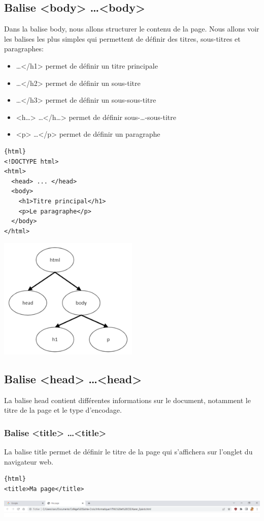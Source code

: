 \documentclass[a4paper,11pt]{article}
\begin{document}
\subsection{Balise <body> \dots <body>}
Dans la balise body, nous allons structurer le contenu de la page. Nous allons voir les balises les plus simples qui permettent de définir des titres, sous-titres et paragraphes:
\begin{itemize}
\item <h1> \dots </h1>  permet de définir un titre principale
\item <h2> \dots </h2>  permet de définir un sous-titre
\item <h3> \dots </h3>  permet de définir un sous-sous-titre
\item <h\dots> \dots </h\dots>  permet de définir  sous-\dots-sous-titre
\item  <p> \dots </p>  permet de définir un paragraphe
\end{itemize}
\begin{multicols}{2}
\begin{verbatim}{html}
<!DOCTYPE html>
<html>
  <head> ... </head>
  <body>
    <h1>Titre principal</h1>
    <p>Le paragraphe</p>
  </body>
</html>
\end{verbatim}
\includegraphics[width=0.5\textwidth]{images/baliseBody.png} \\
\end{multicols}

\subsection{Balise <head> \dots <head>}
La balise head contient différentes informations sur le document, notamment le titre de la page et le type d'encodage.

\subsubsection{Balise <title> \dots <title>}
La balise title permet de définir le titre de la page qui s'affichera sur l'onglet du navigateur web.
\begin{verbatim}{html}
<title>Ma page</title>
\end{verbatim}
\includegraphics[width=1.0\textwidth]{images/Titre.png}
\end{document}
